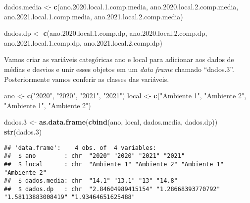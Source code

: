 \documentclass[14pt,titlepage, oneside, openany, a4paper]{book}
\newenvironment{Shaded}{\begin{snugshade}}{\end{snugshade}}
\newcommand{\FloatTok}[1]{\textcolor[rgb]{0.00,0.00,0.81}{#1}}
\newcommand{\KeywordTok}[1]{\textcolor[rgb]{0.13,0.29,0.53}{\textbf{#1}}}
\newcommand{\NormalTok}[1]{#1}
\newcommand{\StringTok}[1]{\textcolor[rgb]{0.31,0.60,0.02}{#1}}
\begin{document}
\begin{Shaded}
\begin{Highlighting}[]
\NormalTok{dados.media <-}\StringTok{ }\KeywordTok{c}\NormalTok{(ano.}\FloatTok{2020.}\NormalTok{local.}\FloatTok{1.}\NormalTok{comp.media,}
\NormalTok{                 ano.}\FloatTok{2020.}\NormalTok{local.}\FloatTok{2.}\NormalTok{comp.media,}
\NormalTok{                 ano.}\FloatTok{2021.}\NormalTok{local.}\FloatTok{1.}\NormalTok{comp.media,}
\NormalTok{                 ano.}\FloatTok{2021.}\NormalTok{local.}\FloatTok{2.}\NormalTok{comp.media)}

\NormalTok{dados.dp <-}\StringTok{ }\KeywordTok{c}\NormalTok{(ano.}\FloatTok{2020.}\NormalTok{local.}\FloatTok{1.}\NormalTok{comp.dp,}
\NormalTok{              ano.}\FloatTok{2020.}\NormalTok{local.}\FloatTok{2.}\NormalTok{comp.dp,}
\NormalTok{              ano.}\FloatTok{2021.}\NormalTok{local.}\FloatTok{1.}\NormalTok{comp.dp,}
\NormalTok{              ano.}\FloatTok{2021.}\NormalTok{local.}\FloatTok{2.}\NormalTok{comp.dp)}
\end{Highlighting}
\end{Shaded}

Vamos criar as variáveis categóricas ano e local para adicionar aos dados de médias e desvios e unir esses objetos em um \emph{data frame} chamado ``dados.3''. Posteriormente vamos conferir as classes das variáveis.

\begin{Shaded}
\begin{Highlighting}[]
\NormalTok{ano <-}\StringTok{ }\KeywordTok{c}\NormalTok{(}\StringTok{"2020"}\NormalTok{, }\StringTok{"2020"}\NormalTok{, }\StringTok{"2021"}\NormalTok{, }\StringTok{"2021"}\NormalTok{)}
\NormalTok{local <-}\StringTok{ }\KeywordTok{c}\NormalTok{(}\StringTok{"Ambiente 1"}\NormalTok{, }\StringTok{"Ambiente 2"}\NormalTok{, }\StringTok{"Ambiente 1"}\NormalTok{, }\StringTok{"Ambiente 2"}\NormalTok{)}

\NormalTok{dados}\FloatTok{.3}\NormalTok{ <-}\StringTok{ }\KeywordTok{as.data.frame}\NormalTok{(}\KeywordTok{cbind}\NormalTok{(ano, local, dados.media, dados.dp))}
\KeywordTok{str}\NormalTok{(dados}\FloatTok{.3}\NormalTok{)}
\end{Highlighting}
\end{Shaded}

\begin{verbatim}
## 'data.frame':    4 obs. of  4 variables:
##  $ ano        : chr  "2020" "2020" "2021" "2021"
##  $ local      : chr  "Ambiente 1" "Ambiente 2" "Ambiente 1" "Ambiente 2"
##  $ dados.media: chr  "14.1" "13.1" "13" "14.8"
##  $ dados.dp   : chr  "2.84604989415154" "1.28668393770792" "1.58113883008419" "1.93464651625488"
\end{verbatim}
\end{document}
